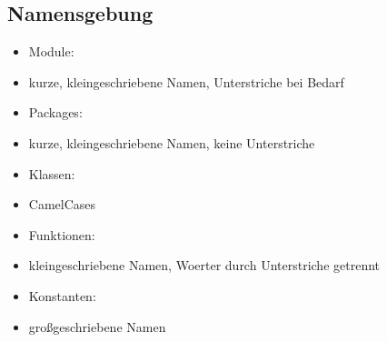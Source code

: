 \documentclass[11pt]{scrartcl}
\begin{document}
		\subsection{Namensgebung}
			\begin{itemize}
				\item Module:
				\item[] kurze, kleingeschriebene Namen, Unterstriche bei Bedarf
				\item Packages:
				\item[] kurze, kleingeschriebene Namen, keine Unterstriche
				\item Klassen:
				\item[] CamelCases
				\item Funktionen:
				\item[] kleingeschriebene Namen, Woerter durch Unterstriche getrennt
				\item Konstanten:
				\item[] großgeschriebene Namen
			\end{itemize}
			
\end{document}
